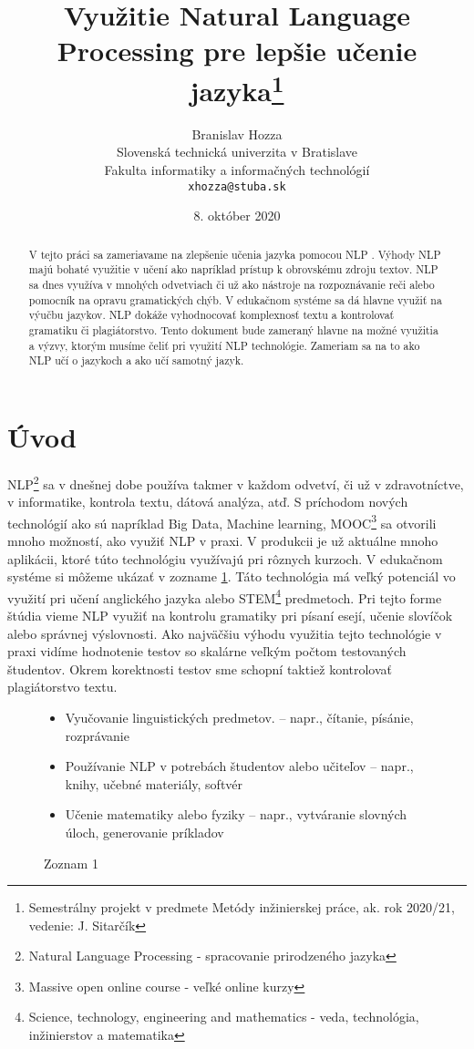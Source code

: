 \documentclass[10pt,twoside,slovak,a4paper]{article}
\title{Využitie Natural Language Processing pre lepšie učenie jazyka\thanks{Semestrálny projekt v predmete Metódy inžinierskej práce, ak. rok 2020/21, vedenie: J. Sitarčík}}
\author{Branislav Hozza\\[2pt]
	{\small Slovenská technická univerzita v Bratislave}\\
	{\small Fakulta informatiky a informačných technológií}\\
	{\small \texttt{xhozza@stuba.sk}}
	}
\date{\small 8. október 2020}
\begin{document}
\maketitle
\begin{abstract}
	V tejto práci sa zameriavame na zlepšenie učenia jazyka pomocou NLP \cite{litman2016natural}. 
	Výhody NLP majú bohaté využitie v učení ako napríklad prístup k obrovskému zdroju textov. 
	NLP sa dnes využíva v mnohých odvetviach či už ako nástroje na rozpoznávanie reči alebo pomocník na opravu gramatických chýb. 
	V edukačnom systéme sa dá hlavne využiť na výučbu jazykov. NLP dokáže vyhodnocovať komplexnosť textu a kontrolovať gramatiku či plagiátorstvo. 
	Tento dokument bude zameraný hlavne na možné využitia a výzvy, ktorým musíme čeliť pri využití NLP technológie. 
	Zameriam sa na to ako NLP učí o jazykoch a ako učí samotný jazyk.
\end{abstract}
\section{Úvod}
NLP\footnote{Natural Language Processing - spracovanie prirodzeného jazyka} sa v dnešnej dobe používa takmer v každom odvetví, či už v zdravotníctve, v informatike, kontrola textu, dátová analýza, atď. 
S príchodom nových technológií ako sú napríklad Big Data, Machine learning, MOOC\footnote{Massive open online course - veľké online kurzy} sa otvorili mnoho možností, 
ako využiť NLP v praxi. V produkcii je už aktuálne mnoho aplikácii, ktoré túto technológiu využívajú pri rôznych kurzoch.
V edukačnom systéme si môžeme ukázať v zozname \ref{zoznam_1}. Táto technológia má veľký potenciál vo využití pri učení anglického jazyka 
alebo STEM\footnote{Science, technology, engineering and mathematics - veda, technológia, inžinierstov a matematika} predmetoch. 
Pri tejto forme štúdia vieme NLP využiť na kontrolu gramatiky pri písaní esejí, učenie slovíčok alebo správnej výslovnosti.
Ako najväčšiu výhodu využitia tejto technológie v praxi vidíme hodnotenie testov so skalárne veľkým počtom testovaných študentov. 
Okrem korektnosti testov sme schopní taktiež kontrolovať plagiátorstvo textu.
\begin{figure}[H]
	\centering
	\begin{itemize}\label{zoznam_1}
			\item Vyučovanie linguistických predmetov.
			– napr., čítanie, písánie, rozprávanie
			\item Používanie NLP v potrebách študentov alebo učiteľov
			– napr., knihy, učebné materiály, softvér
			\item Učenie matematiky alebo fyziky
			– napr., vytváranie slovných úloch, generovanie príkladov
			\end{itemize}
	\caption{Zoznam 1}
\end{figure}
\end{document}
